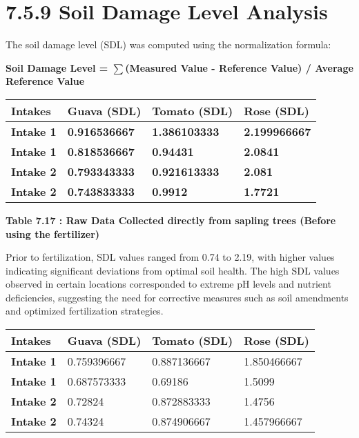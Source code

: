 \documentclass{book} %
\begin{document}
\noindent 

\noindent 
\section{7.5.9 Soil Damage Level Analysis}

\noindent The soil damage level (SDL) was computed using the normalization formula:

\noindent \textbf{Soil Damage Level = $\boldsymbol{\mathrm{\sum}}$(Measured Value - Reference Value) / Average Reference Value} 

\noindent \textbf{}

\begin{tabular}{|p{0.7in}|p{0.7in}|p{0.8in}|p{0.7in}|} \hline 
\textbf{Intakes} & \textbf{Guava (SDL)} & \textbf{Tomato (SDL)} & \textbf{Rose (SDL)} \\ \hline 
\textbf{Intake 1} & \textbf{0.916536667} & \textbf{1.386103333} & \textbf{2.199966667} \\ \hline 
\textbf{Intake 1} & \textbf{0.818536667} & \textbf{0.94431} & \textbf{2.0841} \\ \hline 
\textbf{Intake 2} & \textbf{0.793343333} & \textbf{0.921613333} & \textbf{2.081} \\ \hline 
\textbf{Intake 2} & \textbf{0.743833333} & \textbf{0.9912} & \textbf{1.7721} \\ \hline 
\end{tabular}

\textbf{Table 7.17 : Raw Data Collected directly from sapling trees (Before using the fertilizer)}

\noindent Prior to fertilization, SDL values ranged from 0.74 to 2.19, with higher values indicating significant deviations from optimal soil health. The high SDL values observed in certain locations corresponded to extreme pH levels and nutrient deficiencies, suggesting the need for corrective measures such as soil amendments and optimized fertilization strategies.\textbf{}

\noindent \textbf{}

\begin{tabular}{|p{0.7in}|p{0.7in}|p{0.8in}|p{0.7in}|} \hline 
\textbf{Intakes} & \textbf{Guava (SDL)} & \textbf{Tomato (SDL)} & \textbf{Rose (SDL)} \\ \hline 
\textbf{Intake 1} & 0.759396667 & 0.887136667 & 1.850466667 \\ \hline 
\textbf{Intake 1} & 0.687573333 & 0.69186 & 1.5099 \\ \hline 
\textbf{Intake 2} & 0.72824 & 0.872883333 & 1.4756 \\ \hline 
\textbf{Intake 2} & 0.74324 & 0.874906667 & 1.457966667 \\ \hline 
\end{tabular}
\end{document}
